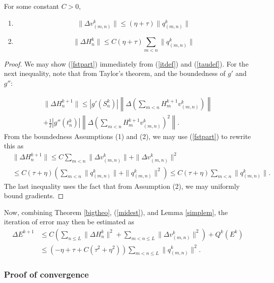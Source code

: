 \documentclass{jcmlatex}
\begin{document}
\begin{lemma}\label{simplem}
For some constant $C>0$,

\begin{enumerate}
\item
\begin{equation}
\|\Delta v^k_{(m,n)}\| \le (\eta+\tau)\|q_{(m,n)}^k\| \label{fstpart}
\end{equation}
\item
\begin{equation}
\|\Delta H^k_n\| \le C(\eta+\tau)\sum_{m<n}\|q_{(m,n)}^k\|
\end{equation}
\end{enumerate}
\end{lemma}\begin{proof}
We may show (\ref{fstpart}) immediately from (\ref{itdef}) and (\ref{taudef}).
For the next inequality, note that from Taylor's theorem, and the boundedness
of $g'$ and  $g''$:

\begin{align}
\|\Delta H^{k+1}_n\| \le |g'(S_n^k)|\left \|\Delta\left(\sum_{m < n} H_m^{k+1}v_{(m,n)}^k
 \right)\right \|\\ +\frac 12|g''(t_{n}^k)|\left \|\Delta\left(\sum_{m <
n}H_m^{k+1}v_{(m,n)}^k \right)^2\right \|.
\end{align}
From the boundedness Assumptions (1) and (2), we may use (\ref{fstpart}) to rewrite this as
\begin{align}
&\|\Delta H^{k+1}_n\| \le C \sum_{m < n}\|\Delta v^k_{(m,n)}\|+\|\Delta v^k_{(m,n)}\|^2\\
&\le C(\tau+\eta)(\sum_{m< n}\|q_{(m,n)}^k\|+\|q_{(m,n)}^k\|^2) \le C(\tau+\eta)\sum_{m
< n}\|q_{(m,n)}^k\| .
\end{align}
 The last inequality uses the fact that from Assumption (2), we may uniformly
bound gradients.
\end{proof}Now, combining Theorem \ref{bigtheo}, (\ref{midest}), and Lemma \ref{simplem},
the iteration of error may then be estimated as
\begin{align}
\Delta E^{k+1} &\le  C\left(\sum_{n\le L}\|\Delta H_n^k\|^2 + \sum_{m<n\le
L}\|\Delta v_{(m,n)}^k\|^2\right)+Q^k(E^k)
\\&\le \left(-\eta+\tau+C(\tau^2+\eta^2)\right) \sum_{m<n \le L} \|q_{(m,n)}^k\|^2.
\label{graddif}
\end{align}\subsubsection{Proof of convergence}
\end{document}
